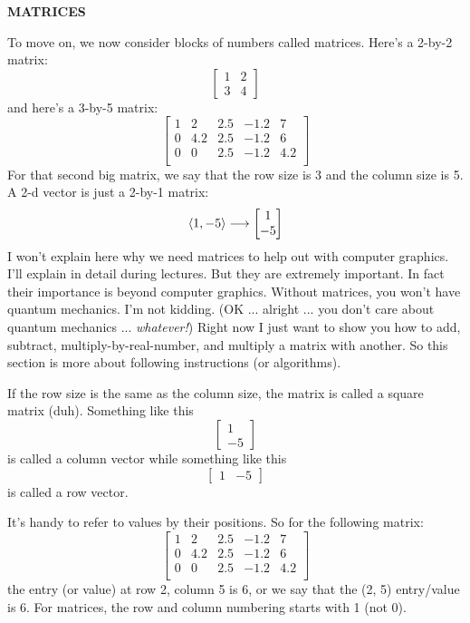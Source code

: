 

\newpage
{\bf MATRICES}

To move on, we now consider blocks of numbers called matrices.
Here's a 2-by-2 matrix:
\[
\begin{bmatrix}
1 & 2 \\
3 & 4
\end{bmatrix}
\]
and here's a 3-by-5 matrix:
\[
\begin{bmatrix}
1 & 2 & 2.5 & -1.2 & 7 \\
0 & 4.2 & 2.5 & -1.2 & 6 \\
0 & 0 & 2.5 & -1.2 & 4.2 \\
\end{bmatrix}
\]
For that second big matrix, we say that the 
row size is 3 and the column size is 5.
A 2-d vector is just a 2-by-1 matrix:
\[
\langle 1, -5 \rangle \longrightarrow
\begin{bmatrix}
1 \\
-5
\end{bmatrix}
\]
I won't explain here why we need matrices to help out with computer
graphics.
I'll explain in detail during lectures.
But they are extremely important.
In fact their importance is beyond computer
graphics. Without matrices, you won't have quantum mechanics.
I'm not kidding. 
(OK ... alright ... you don't care about quantum
mechanics ... {\it whatever!})
Right now I just want to show you how to add, subtract, 
multiply-by-real-number, and multiply a matrix with another.
So this section is more about following instructions (or algorithms).

If the row size is the same as the column size, the matrix
is called a square matrix (duh).
Something like this
\[
\begin{bmatrix}
1 \\
-5
\end{bmatrix}
\]
is called a column vector while something like this
\[
\begin{bmatrix}
1 & -5
\end{bmatrix}
\]
is called a row vector.

It's handy to refer to values by their positions.
So for the following matrix:
\[
\begin{bmatrix}
1 & 2 & 2.5 & -1.2 & 7 \\
0 & 4.2 & 2.5 & -1.2 & 6 \\
0 & 0 & 2.5 & -1.2 & 4.2 \\
\end{bmatrix}
\]
the entry (or value) at row 2, column 5 is 6, or we say that the 
(2, 5) entry/value is 6.
For matrices, the row and column numbering starts with 1 (not 0).

